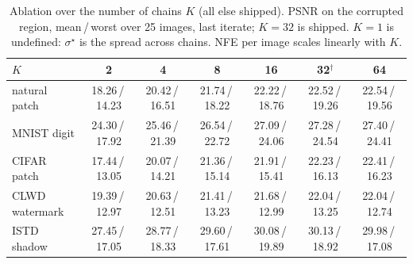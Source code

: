 \begin{table}[t]
\centering\small
\caption{Ablation over the number of chains $K$ (all else shipped). PSNR on the corrupted region, mean\,/\,worst over 25 images, last iterate; $K{=}32$ is shipped. $K{=}1$ is undefined: $\sigma^\star$ is the spread across chains. NFE per image scales linearly with $K$.}
\label{tab:ablation_k}
\begin{tabular}{lcccccc}
\toprule
$K$ & 2 & 4 & 8 & 16 & 32$^\dagger$ & 64 \\
\midrule
natural patch & 18.26\,/\,14.23 & 20.42\,/\,16.51 & 21.74\,/\,18.22 & 22.22\,/\,18.76 & 22.52\,/\,19.26 & 22.54\,/\,19.56 \\
MNIST digit & 24.30\,/\,17.92 & 25.46\,/\,21.39 & 26.54\,/\,22.72 & 27.09\,/\,24.06 & 27.28\,/\,24.54 & 27.40\,/\,24.41 \\
CIFAR patch & 17.44\,/\,13.05 & 20.07\,/\,14.21 & 21.36\,/\,15.14 & 21.91\,/\,15.41 & 22.23\,/\,16.13 & 22.41\,/\,16.23 \\
CLWD watermark & 19.39\,/\,12.97 & 20.63\,/\,12.51 & 21.41\,/\,13.23 & 21.68\,/\,12.99 & 22.04\,/\,13.25 & 22.04\,/\,12.74 \\
ISTD shadow & 27.45\,/\,17.05 & 28.77\,/\,18.33 & 29.60\,/\,17.61 & 30.08\,/\,19.89 & 30.13\,/\,18.92 & 29.98\,/\,17.08 \\
\bottomrule
\end{tabular}
\end{table}
